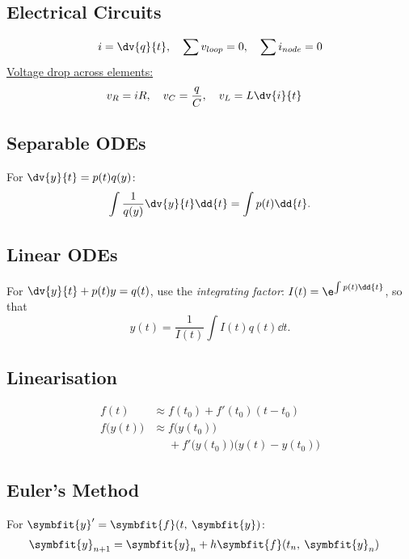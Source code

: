 \documentclass{article}
\begin{document}
\begin{multicols}{3}
    \subsection*{Electrical Circuits}
    \begin{align*}
        i = \dv{q}{t},\quad \sum v_{loop} = 0,\quad \sum i_{node} = 0
    \end{align*}
    \underline{Voltage drop across elements:}
    \begin{align*}
        v_R = iR,\quad v_C = \frac{q}{C},\quad v_L & = L \dv{i}{t}
    \end{align*}
    \subsection*{Separable ODEs}
    For \(\dv{y}{t} = p(t) q(y)\):
    \begin{equation*}
        \int \frac{1}{q(y)} \dv{y}{t} \dd{t} = \int p(t) \dd{t}.
    \end{equation*}
    \subsection*{Linear ODEs}
    For \(\dv{y}{t} + p(t)y = q(t)\), use the \textit{integrating factor}:
    \(I(t) = \e^{\int p(t) \dd{t}}\), so that
    \begin{equation*}
        y(t) = \frac{1}{I(t)} \int I(t) q(t) \dd{t}.
    \end{equation*}
    \subsection*{Linearisation}
    \begin{align*}
        f(t)              & \approx f(t_0) + f'(t_0)(t-t_0)                                 \\
        f\bigl(y(t)\bigr) & \approx f\bigl(y(t_0)\bigr)                                     \\
                          & \phantom{\approx} + f'\bigl(y(t_0)\bigr)\bigl(y(t)-y(t_0)\bigr)
    \end{align*}
    \subsection*{Euler's Method}
    For \(\symbfit{y}' = \symbfit{f}(t,\: \symbfit{y})\):
    \begin{align*}
        \symbfit{y}_{n+1} & = \symbfit{y}_{n} + h\symbfit{f}(t_n,\: \symbfit{y}_n)
    \end{align*}

\end{multicols}
\end{document}
